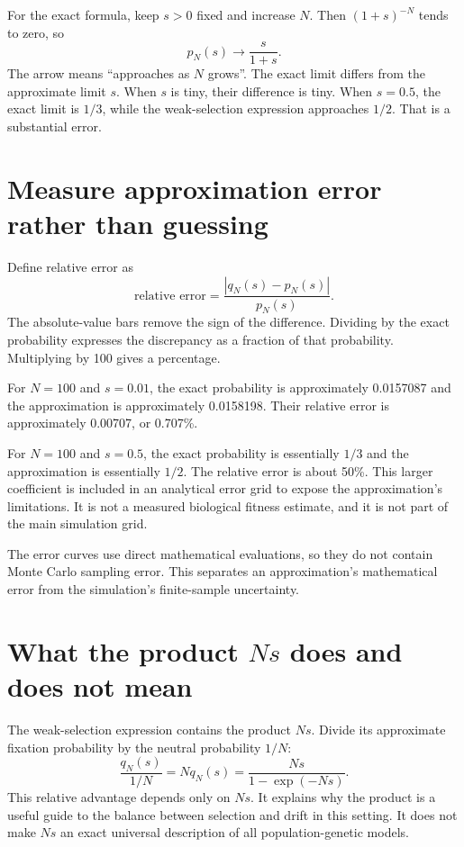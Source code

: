 For the exact formula, keep $s>0$ fixed and increase $N$. Then $(1+s)^{-N}$ tends to zero, so
\begin{equation}
p_N(s)\longrightarrow\frac{s}{1+s}.
\label{eq:large-N-exact}
\end{equation}
The arrow means ``approaches as $N$ grows''. The exact limit differs from the approximate limit $s$. When $s$ is tiny, their difference is tiny. When $s=0.5$, the exact limit is $1/3$, while the weak-selection expression approaches $1/2$. That is a substantial error.

\section{Measure approximation error rather than guessing}

Define relative error as
\begin{equation}
\text{relative error}=\frac{|q_N(s)-p_N(s)|}{p_N(s)}.
\label{eq:relative-error}
\end{equation}
The absolute-value bars remove the sign of the difference. Dividing by the exact probability expresses the discrepancy as a fraction of that probability. Multiplying by 100 gives a percentage.

For $N=100$ and $s=0.01$, the exact probability is approximately 0.0157087 and the approximation is approximately 0.0158198. Their relative error is approximately 0.00707, or 0.707\%.

For $N=100$ and $s=0.5$, the exact probability is essentially $1/3$ and the approximation is essentially $1/2$. The relative error is about 50\%. This larger coefficient is included in an analytical error grid to expose the approximation's limitations. It is not a measured biological fitness estimate, and it is not part of the main simulation grid.

The error curves use direct mathematical evaluations, so they do not contain Monte Carlo sampling error. This separates an approximation's mathematical error from the simulation's finite-sample uncertainty.

\section{What the product \texorpdfstring{$Ns$}{Ns} does and does not mean}

The weak-selection expression contains the product $Ns$. Divide its approximate fixation probability by the neutral probability $1/N$:
\[
\frac{q_N(s)}{1/N}=Nq_N(s)=\frac{Ns}{1-\exp(-Ns)}.
\]
This relative advantage depends only on $Ns$. It explains why the product is a useful guide to the balance between selection and drift in this setting. It does not make $Ns$ an exact universal description of all population-genetic models.

